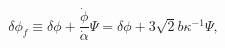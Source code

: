 \begin{equation}
\delta \phi_f \equiv \delta \phi+\frac{\dot{\phi}}{\dot{\alpha}} \Psi
=\delta \phi+3 \sqrt{2} b \kappa^{-1} \Psi,
\end{equation}

